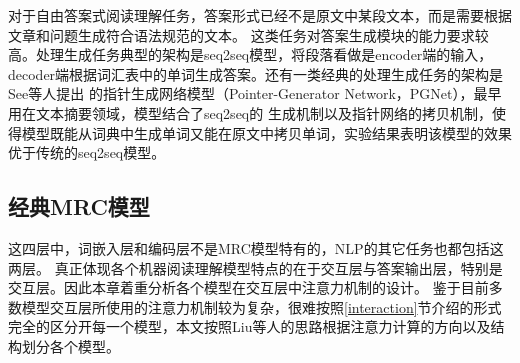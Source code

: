 
对于自由答案式阅读理解任务，答案形式已经不是原文中某段文本，而是需要根据文章和问题生成符合语法规范的文本。
这类任务对答案生成模块的能力要求较高。处理生成任务典型的架构是seq2seq模型，将段落看做是encoder端的输入，decoder端根据词汇表中的单词生成答案。还有一类经典的处理生成任务的架构是See等人提出
的指针生成网络模型（Pointer-Generator Network，PGNet），最早用在文本摘要领域，模型结合了seq2seq的
生成机制以及指针网络的拷贝机制，使得模型既能从词典中生成单词又能在原文中拷贝单词，实验结果表明该模型的效果优于传统的seq2seq模型。


\subsection{经典MRC模型}
这四层中，词嵌入层和编码层不是MRC模型特有的，NLP的其它任务也都包括这两层。
真正体现各个机器阅读理解模型特点的在于交互层与答案输出层，特别是交互层。因此本章着重分析各个模型在交互层中注意力机制的设计。
鉴于目前多数模型交互层所使用的注意力机制较为复杂，很难按照\ref{interaction}节介绍的形式完全的区分开每一个模型，本文按照Liu等人的思路根据注意力计算的方向以及结构划分各个模型。

